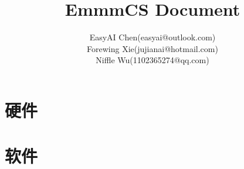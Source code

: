\documentclass[10pt,fancyhdr,UTF8]{ctexbook}
\title{EmmmCS Document}
\author{
        EasyAI Chen(easyai@outlook.com)\\
        Forewing Xie(jujianai@hotmail.com)\\
        Niffle Wu(1102365274@qq.com)
    }
\begin{document}
\begin{sloppypar}
\maketitle
\tableofcontents
\mainmatter

\part{硬件}






\part{软件}


\end{sloppypar}
\end{document}
